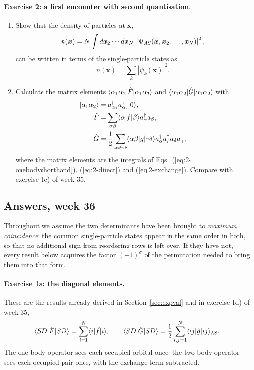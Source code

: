 \paragraph{Exercise 2: a first encounter with second quantisation.}
\begin{enumerate}
  \item[a)] Show that the density of particles at $\bm{x}$,
  \[
    n(\bm{x}) = N\int d\bm{x}_2\cdots d\bm{x}_N\,
      \left|\Psi_{AS}(\bm{x},\bm{x}_2,\dots,\bm{x}_N)\right|^2 ,
  \]
  can be written in terms of the single-particle states as
  \[
    n(\bm{x}) = \sum_k \left|\psi_k(\bm{x})\right|^2 .
  \]
  \item[b)] Calculate the matrix elements
  $\langle \alpha_1\alpha_2 | \hat{F} | \alpha_1\alpha_2 \rangle$ and
  $\langle \alpha_1\alpha_2 | \hat{G} | \alpha_1\alpha_2 \rangle$ with
  \begin{align*}
    \vert \alpha_1\alpha_2 \rangle &= a^{\dagger}_{\alpha_1}a^{\dagger}_{\alpha_2}
      \vert 0 \rangle,\\
    \hat{F} &= \sum_{\alpha\beta}\langle\alpha|f|\beta\rangle
      a^{\dagger}_{\alpha}a_{\beta},\\
    \hat{G} &= \frac{1}{2}\sum_{\alpha\beta\gamma\delta}
      \langle\alpha\beta|g|\gamma\delta\rangle
      a^{\dagger}_{\alpha}a^{\dagger}_{\beta}a_{\delta}a_{\gamma},
  \end{align*}
  where the matrix elements are the integrals of
  Eqs.~(\ref{eq:2-onebodyshorthand}), (\ref{eq:2-direct}) and
  (\ref{eq:2-exchange}).  Compare with exercise 1c) of week 35.
\end{enumerate}

\subsection*{Answers, week 36}

Throughout we assume the two determinants have been brought to \emph{maximum
coincidence}: the common single-particle states appear in the same order in
both, so that no additional sign from reordering rows is left over.  If they
have not, every result below acquires the factor $(-1)^{\sigma}$ of the
permutation needed to bring them into that form.

\paragraph{Exercise 1a: the diagonal elements.}
These are the results already derived in Section~\ref{sec:expval} and in
exercise 1d) of week 35,
\begin{equation}
  \langle SD | \hat{F} | SD \rangle = \sum_{i=1}^{N}\langle i|\hat{f}|i\rangle,
  \qquad
  \langle SD | \hat{G} | SD \rangle
   = \frac{1}{2}\sum_{i,j=1}^{N}\langle ij|\hat{g}|ij\rangle_{\mathrm{AS}} .
  \label{eq:2-w36a}
\end{equation}
The one-body operator sees each occupied orbital once; the two-body operator
sees each occupied pair once, with the exchange term subtracted.

